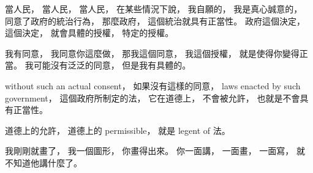 \hypertarget{w02:cue:1088}{}當人民，
\hypertarget{w02:cue:1089}{}當人民，
\hypertarget{w02:cue:1090}{}當人民，
\hypertarget{w02:cue:1091}{}在某些情況下說，
\hypertarget{w02:cue:1092}{}我自願的，
\hypertarget{w02:cue:1093}{}我是真心誠意的，
\hypertarget{w02:cue:1094}{}同意了政府的統治行為，
\hypertarget{w02:cue:1095}{}那麼政府，
\hypertarget{w02:cue:1096}{}這個統治就具有正當性。
\hypertarget{w02:cue:1097}{}政府這個決定，
\hypertarget{w02:cue:1098}{}這個決定，
\hypertarget{w02:cue:1099}{}就會具體的授權，
\hypertarget{w02:cue:1100}{}特定的授權。

\hypertarget{w02:cue:1101}{}我有同意，
\hypertarget{w02:cue:1102}{}我同意你這麼做，
\hypertarget{w02:cue:1103}{}那我這個同意，
\hypertarget{w02:cue:1104}{}我這個授權，
\hypertarget{w02:cue:1105}{}就是使得你變得正當。
\hypertarget{w02:cue:1106}{}我可能沒有泛泛的同意，
\hypertarget{w02:cue:1107}{}但是我有具體的。

\hypertarget{w02:cue:1108}{}without such an actual consent，
\hypertarget{w02:cue:1109}{}如果沒有這樣的同意，
\hypertarget{w02:cue:1110}{}laws enacted by such government，
\hypertarget{w02:cue:1111}{}這個政府所制定的法，
\hypertarget{w02:cue:1112}{}它在道德上，
\hypertarget{w02:cue:1113}{}不會被允許，
\hypertarget{w02:cue:1114}{}也就是不會具有正當性。

\hypertarget{w02:cue:1115}{}道德上的允許，
\hypertarget{w02:cue:1116}{}道德上的 permissible，
\hypertarget{w02:cue:1117}{}就是 legent of 法。

\hypertarget{w02:cue:1118}{}我剛剛就畫了，
\hypertarget{w02:cue:1119}{}我一個圖形，
\hypertarget{w02:cue:1120}{}你畫得出來。
\hypertarget{w02:cue:1121}{}你一面講，
\hypertarget{w02:cue:1122}{}一面畫，
\hypertarget{w02:cue:1123}{}一面寫，
\hypertarget{w02:cue:1124}{}就不知道他講什麼了。

